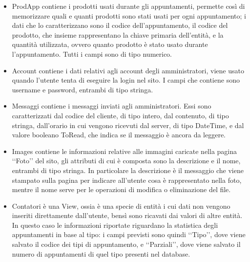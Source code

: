 {{\begin{itemize}
			\item ProdApp contiene i prodotti usati durante gli appuntamenti, permette così di memorizzare quali e quanti prodotti sono stati usati per ogni appuntamento; i dati che lo caratterizzano sono il codice dell'appuntamento, il codice del prodotto, che insieme rappresentano la chiave primaria dell'entità, e la quantità utilizzata, ovvero quanto prodotto è stato usato durante l'appuntamento. Tutti i campi sono di tipo numerico.
			\item Account contiene i dati relativi agli account degli amministratori, viene usato quando l'utente tenta di eseguire la login nel sito. I campi che contiene sono username e password, entrambi di tipo stringa.
			\item Messaggi contiene i messaggi inviati agli amministratori. Essi sono caratterizzati dal codice del cliente, di tipo intero, dal contenuto, di tipo stringa, dall'orario in cui vengono ricevuti dal server, di tipo DateTime, e dal valore booleano ToRead, che indica se il messaggio è ancora da leggere.
			\item Images contiene le informazioni relative alle immagini caricate nella pagina ‘‘Foto’’ del sito, gli attributi di cui è composta sono la descrizione e il nome, entrambi di tipo stringa. In particolare la descrizione è il messaggio che viene stampato sulla pagina per indicare all'utente cosa è rappresentato nella foto, mentre il nome serve per le operazioni di modifica o eliminazione del file.
			\item Contatori è una View, ossia è una specie di entità i cui dati non vengono inseriti direttamente dall'utente, bensì sono ricavati dai valori di altre entità. In questo caso le informazioni riportate riguardano la statistica degli appuntamenti in base al tipo: i campi previsti sono quindi ‘‘Tipo’’, dove viene salvato il codice dei tipi di appuntamento, e ‘‘Parziali’’, dove viene salvato il numero di appuntamenti di quel tipo presenti nel database.
		\end{itemize}
	}
}
